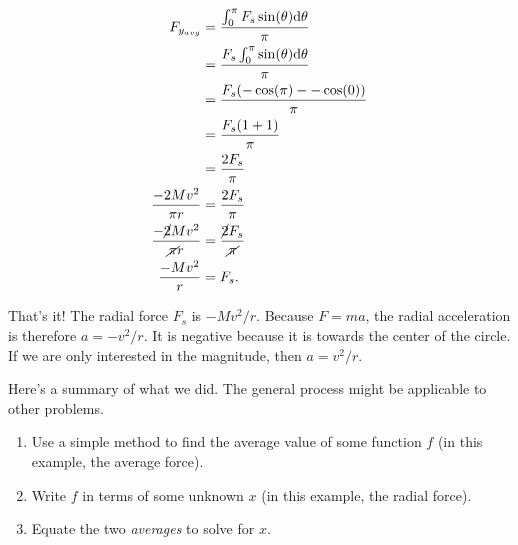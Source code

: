\documentclass[18pt]{article} %
\begin{document}
\begingroup
\Large
\begin{align*}
    F_{y_{avg}} &= \frac{\int_{0}^{\pi}F_s\sin(\theta)\mathrm{d}\theta}{\pi} \\
                &= \frac{F_s\int_{0}^{\pi}\sin(\theta)\mathrm{d}\theta}{\pi} \\
                &= \frac{F_s(-\cos(\pi) - -\cos(0))}{\pi} \\
                &= \frac{F_s(1 + 1)}{\pi} \\
                &= \frac{2F_s}{\pi} \\
    \frac{-2Mv^2}{\pi r} &= \frac{2F_s}{\pi} \\
    \frac{-\cancel{2}Mv^2}{\cancel{\pi} r} &= \frac{\cancel{2}F_s}{\cancel{\pi}} \\
    \frac{-Mv^2}{r} &= F_s. \\
\end{align*}
\endgroup

That's it! The radial force $F_s$ is $-Mv^2/r$. Because $F=ma$, the radial
acceleration is therefore $a = -v^2/r$. It is negative because it is towards the
center of the circle. If we are only interested in the magnitude, then $a
= v^2/r$.

Here's a summary of what we did. The general process might be applicable to
other problems.

\begin{enumerate}
    \item Use a simple method to find the average value of some function $f$
          (in this example, the average force).
    \item Write $f$ in terms of some unknown $x$ (in this example, the radial
          force).
    \item Equate the two \emph{averages} to solve for $x$.
\end{enumerate}
\end{document}
